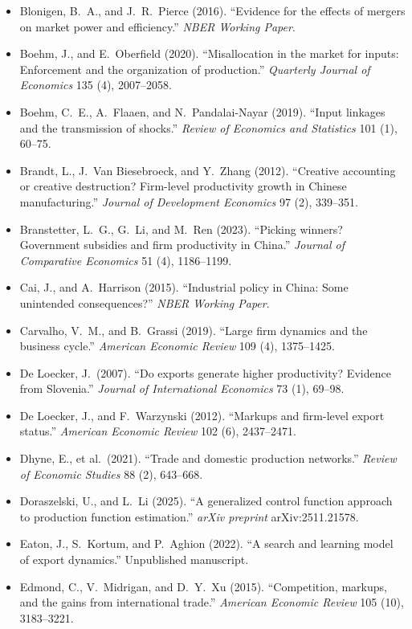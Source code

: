 \documentclass[11pt,a4paper]{article}
\begin{document}
\begin{itemize}
\item Blonigen, B.\ A., and J.\ R.\ Pierce (2016). ``Evidence for the effects of mergers on market power and efficiency.'' \textit{NBER Working Paper}.
\item Boehm, J., and E.\ Oberfield (2020). ``Misallocation in the market for inputs: Enforcement and the organization of production.'' \textit{Quarterly Journal of Economics} 135 (4), 2007--2058.
\item Boehm, C.\ E., A.\ Flaaen, and N.\ Pandalai-Nayar (2019). ``Input linkages and the transmission of shocks.'' \textit{Review of Economics and Statistics} 101 (1), 60--75.
\item Brandt, L., J.\ Van Biesebroeck, and Y.\ Zhang (2012). ``Creative accounting or creative destruction? Firm-level productivity growth in Chinese manufacturing.'' \textit{Journal of Development Economics} 97 (2), 339--351.
\item Branstetter, L.\ G., G.\ Li, and M.\ Ren (2023). ``Picking winners? Government subsidies and firm productivity in China.'' \textit{Journal of Comparative Economics} 51 (4), 1186--1199.
\item Cai, J., and A.\ Harrison (2015). ``Industrial policy in China: Some unintended consequences?'' \textit{NBER Working Paper}.
\item Carvalho, V.\ M., and B.\ Grassi (2019). ``Large firm dynamics and the business cycle.'' \textit{American Economic Review} 109 (4), 1375--1425.\item De Loecker, J.\ (2007). ``Do exports generate higher productivity? Evidence from Slovenia.'' \textit{Journal of International Economics} 73 (1), 69--98.\item De Loecker, J., and F.\ Warzynski (2012). ``Markups and firm-level export status.'' \textit{American Economic Review} 102 (6), 2437--2471.
\item Dhyne, E., et al.\ (2021). ``Trade and domestic production networks.'' \textit{Review of Economic Studies} 88 (2), 643--668.
\item Doraszelski, U., and L.\ Li (2025). ``A generalized control function approach to production function estimation.'' \textit{arXiv preprint} arXiv:2511.21578.
\item Eaton, J., S.\ Kortum, and P.\ Aghion (2022). ``A search and learning model of export dynamics.'' Unpublished manuscript.
\item Edmond, C., V.\ Midrigan, and D.\ Y.\ Xu (2015). ``Competition, markups, and the gains from international trade.'' \textit{American Economic Review} 105 (10), 3183--3221.

\end{itemize}
\end{document}
